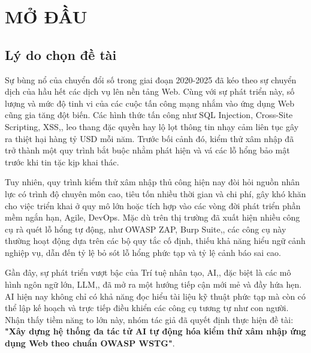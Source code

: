 \chapter*{\centering\Large{MỞ ĐẦU}}

\section*{Lý do chọn đề tài}
Sự bùng nổ của chuyển đổi số trong giai đoạn 2020-2025 đã kéo theo sự chuyển dịch của hầu hết các dịch vụ lên nền tảng Web. Cùng với sự phát triển này, số lượng và mức độ tinh vi của các cuộc tấn công mạng nhắm vào ứng dụng Web cũng gia tăng đột biến. Các hình thức tấn công như SQL Injection, Cross-Site Scripting, XSS,, leo thang đặc quyền hay lộ lọt thông tin nhạy cảm liên tục gây ra thiệt hại hàng tỷ USD mỗi năm. Trước bối cảnh đó, kiểm thử xâm nhập đã trở thành một quy trình bắt buộc nhằm phát hiện và vá các lỗ hổng bảo mật trước khi tin tặc kịp khai thác. 

Tuy nhiên, quy trình kiểm thử xâm nhập thủ công hiện nay đòi hỏi nguồn nhân lực có trình độ chuyên môn cao, tiêu tốn nhiều thời gian và chi phí, gây khó khăn cho việc triển khai ở quy mô lớn hoặc tích hợp vào các vòng đời phát triển phần mềm ngắn hạn, Agile, DevOps. Mặc dù trên thị trường đã xuất hiện nhiều công cụ rà quét lỗ hổng tự động, như OWASP ZAP, Burp Suite,, các công cụ này thường hoạt động dựa trên các bộ quy tắc cố định, thiếu khả năng hiểu ngữ cảnh nghiệp vụ, dẫn đến tỷ lệ bỏ sót lỗ hổng phức tạp và tỷ lệ cảnh báo sai cao. 

Gần đây, sự phát triển vượt bậc của Trí tuệ nhân tạo, AI,, đặc biệt là các mô hình ngôn ngữ lớn, LLM,, đã mở ra một hướng tiếp cận mới mẻ và đầy hứa hẹn. AI hiện nay không chỉ có khả năng đọc hiểu tài liệu kỹ thuật phức tạp mà còn có thể lập kế hoạch và trực tiếp điều khiển các công cụ tương tự như con người. Nhận thấy tiềm năng to lớn này, nhóm tác giả đã quyết định thực hiện đề tài: \textbf{"Xây dựng hệ thống đa tác tử AI tự động hóa kiểm thử xâm nhập ứng dụng Web theo chuẩn OWASP WSTG"}.

